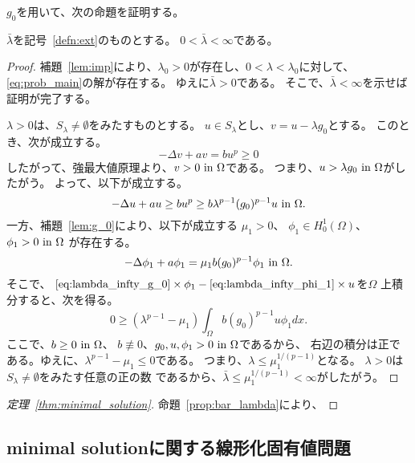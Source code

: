 $g_0$を用いて、次の命題を証明する。

\begin{prop} \label{prop:bar_lambda}
 $\bar{\lambda}$を記号~\ref{defn:ext}のものとする。
 $0 < \bar{\lambda} < \infty$である。
\end{prop}

\begin{proof}
補題~\ref{lem:imp}により、$\lambda_0 > 0$が存在し、$0 < \lambda <
 \lambda_0$に対して、\ref{eq:prob_main}の解が存在する。
ゆえに$\bar{\lambda} > 0$である。
そこで、$\bar{\lambda} < \infty$を示せば証明が完了する。

$\lambda > 0$は、$S_\lambda \neq \emptyset$をみたすものとする。
$u \in S_\lambda$とし、$v = u - \lambda g_0$とする。
このとき、次が成立する。
\[
 -\Delta v + av = bu^p \geq 0
\]
したがって、強最大値原理より、$v > 0 ~\text{in}~ \Omega$である。
つまり、$u > \lambda g_0 ~\text{in}~ \Omega$がしたがう。
よって、以下が成立する。
\begin{equation}
 - \Delta u + au \geq bu^p \geq b \lambda^{p-1} (g_0)^{p-1} u ~\text{in}~
  \Omega. \label{eq:lambda_infty_g_0} 
\end{equation}
一方、補題~\ref{lem:g_0}により、以下が成立する
$\mu_1 > 0$、
$\phi_1 \in H_0^1(\Omega)$、$\phi_1 > 0 ~\text{in}~ \Omega$
が存在する。
\begin{equation}
 -\Delta \phi_1 + a \phi_1 = \mu_1 b (g_0)^{p-1} \phi_1 ~\text{in}~ \Omega. 
  \label{eq:lambda_infty_phi_1} 
\end{equation}
 そこで、
 $\text{\eqref{eq:lambda_infty_g_0}} \times \phi_1 - 
 \text{\eqref{eq:lambda_infty_phi_1}} \times u $を$\Omega$
 上積分すると、次を得る。
 \[
  0 \geq (\lambda^{p-1} - \mu_1) \int_\Omega b(g_0)^{p-1} u \phi_1 dx.
 \]
 ここで、$b \geq 0 ~\text{in}~ \Omega$、
 $b \not \equiv 0$、$g_0, u, \phi_1 > 0 ~\text{in}~ \Omega$であるから、
 右辺の積分は正である。ゆえに、$\lambda^{p-1} - \mu_1 \leq 0$である。
 つまり、$\lambda \leq \mu_1^{1/(p-1)}$となる。
 $\lambda > 0$は$S_\lambda \neq \emptyset$をみたす任意の正の数
 であるから、$\bar{\lambda} \leq \mu_1 ^{1/(p-1)} < \infty$がしたがう。
 \qedhere
\end{proof}

\begin{proof}[定理~\ref{thm:minimal_solution}]
 命題~\ref{prop:bar_lambda}により、
\end{proof}

\subsection{minimal solutionに関する線形化固有値問題}

